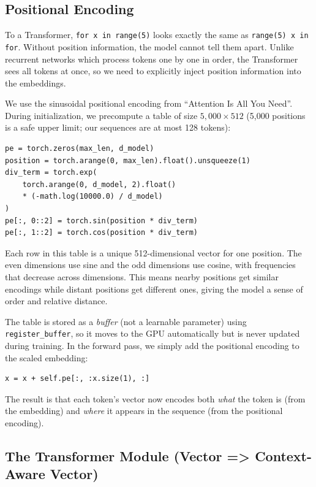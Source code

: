 \documentclass[11pt]{article}
\begin{document}
\subsection{Positional Encoding}

To a Transformer, \texttt{for x in range(5)} looks exactly the same as \texttt{range(5) x in for}. Without position information, the model cannot tell them apart. Unlike recurrent networks which process tokens one by one in order, the Transformer sees all tokens at once, so we need to explicitly inject position information into the embeddings.

We use the sinusoidal positional encoding from ``Attention Is All You Need''. During initialization, we precompute a table of size $5{,}000 \times 512$ (5,000 positions is a safe upper limit; our sequences are at most 128 tokens):

\begin{lstlisting}[style=python]
pe = torch.zeros(max_len, d_model)
position = torch.arange(0, max_len).float().unsqueeze(1)
div_term = torch.exp(
    torch.arange(0, d_model, 2).float()
    * (-math.log(10000.0) / d_model)
)
pe[:, 0::2] = torch.sin(position * div_term)
pe[:, 1::2] = torch.cos(position * div_term)
\end{lstlisting}

Each row in this table is a unique 512-dimensional vector for one position. The even dimensions use sine and the odd dimensions use cosine, with frequencies that decrease across dimensions. This means nearby positions get similar encodings while distant positions get different ones, giving the model a sense of order and relative distance.

The table is stored as a \emph{buffer} (not a learnable parameter) using \texttt{register\_buffer}, so it moves to the GPU automatically but is never updated during training. In the forward pass, we simply add the positional encoding to the scaled embedding:

\begin{lstlisting}[style=python]
x = x + self.pe[:, :x.size(1), :]
\end{lstlisting}

The result is that each token's vector now encodes both \emph{what} the token is (from the embedding) and \emph{where} it appears in the sequence (from the positional encoding).

\subsection{The Transformer Module (Vector => Context-Aware Vector)}
\end{document}

